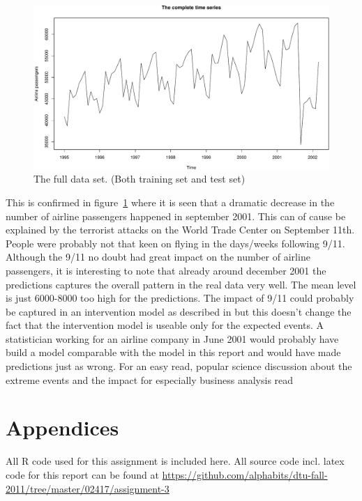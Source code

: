 \begin{figure}[!ht]
    \centering
    \includegraphics[width=120mm]{../plots/full-data-set.pdf}
    \caption{The full data set. (Both training set and test set)}
    \label{fig:full-data-set}
\end{figure}

This is confirmed in figure~\ref{fig:full-data-set} where it is seen that a
dramatic decrease in the number of airline passengers happened in september
2001. This can of cause be explained by the terrorist attacks on the World
Trade Center on September 11th. People were probably not that keen on flying in
the days/weeks following 9/11. Although the 9/11 no doubt had great impact on
the number of airline passengers, it is interesting to note that already around
december 2001 the predictions captures the overall pattern in the real data
very well. The mean level is just 6000-8000 too high for the predictions. The
impact of 9/11 could probably be captured in an intervention model as described
in \cite{hm} but this doesn't change the fact that the intervention model is
useable only for the expected events. A statistician working for an airline
company in June 2001 would probably have build a model comparable with the
model in this report and would have made predictions just as wrong. For an easy
read, popular science discussion about the extreme events and the impact for
especially business analysis read \cite{taleb}

\FloatBarrier

\pagebreak


\renewcommand\thesection{\Alph{section}}
\section{Appendices}

All R code used for this assignment is included here. All source code incl.
latex code for this report can be found at
{\small\url{https://github.com/alphabits/dtu-fall-2011/tree/master/02417/assignment-3}}


